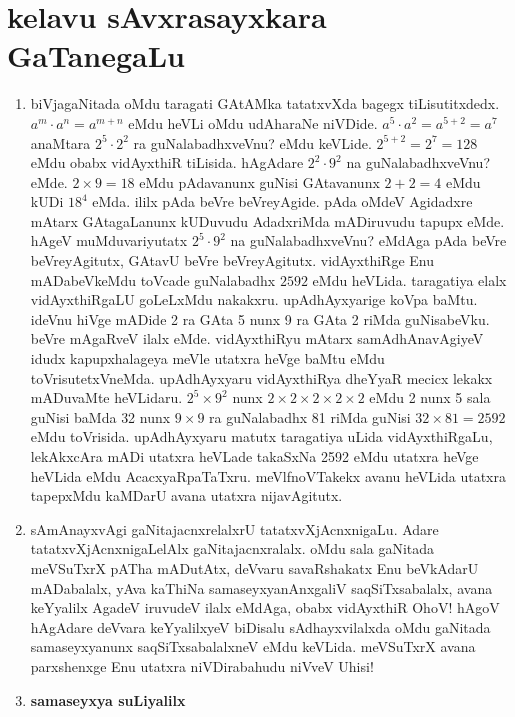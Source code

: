 \chapter{kelavu sAvxrasayxkara GaTanegaLu}

\begin{enumerate}[\rm 1)]
\item biVjagaNitada oMdu taragati GAtAMka tatatxvXda bagegx tiLisutitxdedx. $a^m\cdot a^n=a^{m+n}$ eMdu heVLi oMdu udAharaNe niVDide. $a^5\cdot a^2=a^{5+2}=a^7$ anaMtara $2^5\cdot 2^2$ ra guNalabadhxveVnu? eMdu keVLide. $2^{5+2}=2^7=128$ eMdu obabx vidAyxthiR tiLisida. hAgAdare $2^2\cdot 9^2$ na guNalabadhxveVnu? eMde. $2\times 9=18$ eMdu pAdavanunx guNisi GAtavanunx $2+2=4$ eMdu kUDi $18^4$ eMda. ililx pAda beVre beVreyAgide. pAda oMdeV Agidadxre mAtarx GAtagaLanunx kUDuvudu AdadxriMda mADiruvudu tapupx eMde. hAgeV muMduvariyutatx $2^5\cdot 9^2$ na guNalabadhxveVnu? eMdAga pAda beVre beVreyAgitutx, GAtavU beVre beVreyAgitutx. vidAyxthiRge Enu mADabeVkeMdu toVcade guNalabadhx $2592$ eMdu heVLida. taragatiya elalx vidAyxthiRgaLU goLeLxMdu nakakxru. upAdhAyxyarige koVpa baMtu. ideVnu hiVge mADide {\rm 2} ra GAta {\rm 5} nunx {\rm 9} ra GAta {\rm 2} riMda guNisabeVku. beVre mAgaRveV ilalx eMde. vidAyxthiRyu mAtarx samAdhAnavAgiyeV idudx kapupxhalageya meVle utatxra heVge baMtu eMdu toVrisutetxVneMda. upAdhAyxyaru vidAyxthiRya dheYyaR mecicx lekakx mADuvaMte heVLidaru. $2^5\times 9^2$ nunx $2\times 2\times 2\times 2\times 2$ eMdu {\rm 2} nunx {\rm 5} sala guNisi baMda {\rm 32} nunx $9\times 9$ ra guNalabadhx {\rm 81} riMda guNisi $32\times 81=2592$ eMdu toVrisida. upAdhAyxyaru matutx taragatiya uLida vidAyxthiRgaLu, lekAkxcAra mADi utatxra heVLade takaSxNa {\rm 2592} eMdu utatxra heVge heVLida eMdu AcacxyaRpaTaTxru. meVlfnoVTakekx avanu heVLida utatxra tapepxMdu kaMDarU avana utatxra nijavAgitutx.

\item sAmAnayxvAgi gaNitajacnxrelalxrU tatatxvXjAcnxnigaLu. Adare tatatxvXjAcnxnigaLelAlx gaNitajacnxralalx. oMdu sala gaNitada meVSuTxrX pATha mADutAtx, deVvaru savaRshakatx Enu beVkAdarU mADabalalx, yAva kaThiNa samaseyxyanAnxgaliV saqSiTxsabalalx, avana keYyalilx AgadeV iruvudeV ilalx eMdAga, obabx vidAyxthiR OhoV! hAgoV hAgAdare deVvara keYyalilxyeV biDisalu sAdhayxvilalxda oMdu gaNitada samaseyxyanunx saqSiTxsabalalxneV eMdu keVLida. meVSuTxrX avana parxshenxge Enu utatxra niVDirabahudu niVveV Uhisi!

\item \textbf{samaseyxya suLiyalilx}


\end{enumerate}
